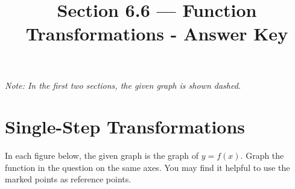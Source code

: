 

\title{Section 6.6 --- Function Transformations - Answer Key}



\maketitle
\emph{Note: In the first two sections, the given graph is shown dashed.}
\section*{Single-Step Transformations}
In each figure below, the given graph is the graph of $y=f(x)$. Graph the function in the question on the same axes. You may find it helpful to use the marked points as reference points.
